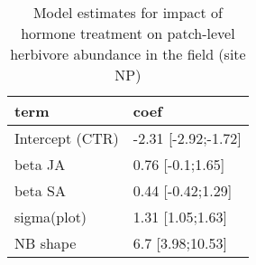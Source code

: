 \begin{table}

\caption{\label{tab:}Model estimates for impact of hormone treatment on patch-level herbivore abundance in the field (site NP)}
\centering
\begin{tabular}[t]{ll}
\toprule
term & coef\\
\midrule
Intercept (CTR) & -2.31 [-2.92;-1.72]\\
beta JA & 0.76 [-0.1;1.65]\\
beta SA & 0.44 [-0.42;1.29]\\
sigma(plot) & 1.31 [1.05;1.63]\\
NB shape & 6.7 [3.98;10.53]\\
\bottomrule
\end{tabular}
\end{table}